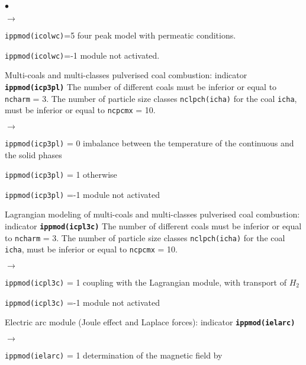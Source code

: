 {{{\begin{list}{$\bullet$}{}
\begin{list}{$\rightarrow$}{}
               \item \texttt{ippmod(icolwc)}=5 four peak model with permeatic conditions.
               \item \texttt{ippmod(icolwc)}=-1 module not activated.
          \end{list}
        \item Multi-coals and multi-classes pulverised coal combustion:
              indicator {\bf \tt ippmod(icp3pl)}
              The number of different coals must be inferior or equal to
              \texttt{ncharm} = 3. The number of particle size
             classes \texttt{nclpch(icha)} for the coal
             \texttt{icha}, must
             be inferior or equal to \texttt{ncpcmx} = 10.
         \begin{list}{$\rightarrow$}{}
                \item \texttt{ippmod(icp3pl)} = 0 imbalance between the
                      temperature of the continuous and the solid phases
                \item \texttt{ippmod(icp3pl)} = 1 otherwise
                \item \texttt{ippmod(icp3pl)} =-1 module not activated
         \end{list}
        \item Lagrangian modeling of multi-coals and
             multi-classes pulverised coal combustion:
                 indicator {\bf \tt ippmod(icpl3c)}
              The number of different coals must be inferior or equal to
              \texttt{ncharm} = 3. The number of particle size
             classes \texttt{nclpch(icha)} for the coal
             \texttt{icha}, must be inferior or equal to
             \texttt{ncpcmx} = 10.
         \begin{list}{$\rightarrow$}{}
                \item \texttt{ippmod(icpl3c)} = 1 coupling with the Lagrangian
                      module, with transport of $H_2$
                \item \texttt{ippmod(icpl3c)} =-1 module not activated
         \end{list}
       \item Electric arc module (Joule effect and Laplace forces):
             indicator {\bf \tt ippmod(ielarc)}
        \begin{list}{$\rightarrow$}{}
               \item \texttt{ippmod(ielarc)} = 1 determination of the magnetic field by

\end{list}
\end{list}}}}
